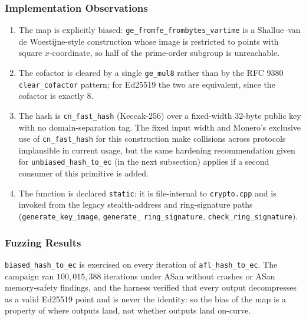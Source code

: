 \documentclass[12pt,titlepage,table]{article}
\begin{document}
\subsubsection{Implementation Observations}
\begin{enumerate}
\item The map is explicitly biased: \verb+ge_fromfe_frombytes_vartime+ is a Shallue--van de Woestijne-style construction whose image is restricted to points with square $x$-coordinate, so half of the prime-order subgroup is unreachable.
\item The cofactor is cleared by a single \verb+ge_mul8+ rather than by the RFC 9380 \verb+clear_cofactor+ pattern; for Ed25519 the two are equivalent, since the cofactor is exactly $8$.
\item The hash is \verb+cn_fast_hash+ (Keccak-256) over a fixed-width $32$-byte public key with no domain-separation tag.  The fixed input width and Monero's exclusive use of \verb+cn_fast_hash+ for this construction make collisions across protocols implausible in current usage, but the same hardening recommendation given for \verb+unbiased_hash_to_ec+ (in the next subsection) applies if a second consumer of this primitive is added.
\item The function is declared \verb+static+: it is file-internal to \verb+crypto.cpp+ and is invoked from the legacy stealth-address and ring-signature paths (\verb+generate_key_image+, \verb+generate_+ \verb+ring_signature+, \verb+check_ring_signature+).

\end{enumerate}


\subsubsection{Fuzzing Results}
\verb+biased_hash_to_ec+ is exercised on every iteration of \verb+afl_hash_to_ec+.  The campaign ran $100{,}015{,}388$ iterations under ASan without crashes or ASan memory-safety findings, and the harness verified that every output decompresses as a valid Ed25519 point and is never the identity: so the bias of the map is a property of where outputs land, not whether outputs land on-curve.

\end{document}
